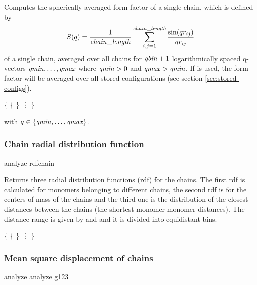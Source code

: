 Computes the spherically averaged form factor of a single chain, which
is defined by
\begin{equation}
  S(q) = \frac{1}{\mathrm{\mathit{chain\_length}}} \sum_{i,j=1}^{\mathrm{\mathit{chain\_length}}}
  \frac{\sin(q r_{ij})}{q r_{ij}}
\end{equation}
of a single chain, averaged over all chains for $\mathrm{\mathit{qbin}}+1$
logarithmically spaced q-vectors $\mathrm{\mathit{qmin}}, \dots ,\mathrm{\mathit{qmax}}$ where
$\mathrm{\mathit{qmin}}>0$ and $\mathrm{\mathit{qmax}}>\mathrm{\mathit{qmin}}$.  If  is
used, the form factor will be averaged over all stored configurations
(see section \vref{sec:stored-configs}).


\begin{code}
\{
  \{   \}
  \vdots
\}
\end{code}
with $q \in \{\mathrm{\mathit{qmin}},\dots,\mathrm{\mathit{qmax}}\}$.

\subsubsection{Chain radial distribution function}

\begin{essyntax}
 analyze rdfchain    
\end{essyntax}
Returns three radial distribution functions (rdf) for the chains. The
first rdf is calculated for monomers belonging to different chains,
the second rdf is for the centers of mass of the chains and the third
one is the distribution of the closest distances between the chains
(\ie the shortest monomer-monomer distances). The distance range is
given by  and  and it is divided into
 equidistant bins.

\begin{code}
\{ 
  \{    \}
  \vdots
\}
\end{code}

\subsubsection{Mean square displacement of chains}
\label{analyze:<g1>}
\label{analyze:<g2>}
\label{analyze:<g3>}
\label{analyze:g123}

\begin{essyntax}
   analyze  
   analyze g123  
\end{essyntax}

